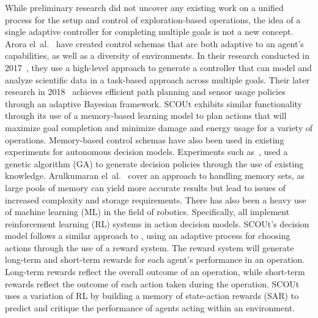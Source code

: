 While preliminary research did not uncover any existing work on a unified process for the setup and control of exploration-based operations, the idea of a single adaptive controller for completing multiple goals is not a new concept.
Arora el~al.~\cite{arora_approach_2017, hutter_online_2018} have created control schemas that are both adaptive to an agent's capabilities, as well as a diversity of environments.
In their research conducted in 2017~\cite{arora_approach_2017}, they use a high-level approach to generate a controller that can model and analyze scientific data in a task-based approach across multiple goals.
Their later research in 2018~\cite{hutter_online_2018} achieves efficient path planning and sensor usage policies through an adaptive Bayesian framework.
SCOUt exhibits similar functionality through its use of a memory-based learning model to plan actions that will maximize goal completion and minimize damage and energy usage for a variety of operations.
Memory-based control schemas have also been used in existing experiments for autonomous decision models.
Experiments such as~\cite{fu_genetic_2003, yi_new_2011}, used a genetic algorithm (GA) to generate decision policies through the use of existing knowledge.
Arulkumaran el~al.~\cite{arulkumaran_brief_2017} cover an approach to handling memory sets, as large pools of memory can yield more accurate results but lead to issues of increased complexity and storage requirements.
There has also been a heavy use of machine learning (ML) in the field of robotics.
Specifically, \cite{arulkumaran_brief_2017, bai_toward_2017, kiumarsi_optimal_2018} all implement reinforcement learning (RL) systems in action decision models.
SCOUt's decision model follows a similar approach to \cite{kiumarsi_optimal_2018}, using an adaptive process for choosing actions through the use of a reward system.
The reward system will generate long-term and short-term rewards for each agent's performance in an operation.
Long-term rewards reflect the overall outcome of an operation, while short-term rewards reflect the outcome of each action taken during the operation.
SCOUt uses a variation of RL by building a memory of state-action rewards (SAR) to predict and critique the performance of agents acting within an environment.


